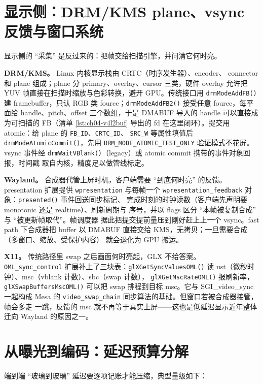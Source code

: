 \documentclass[12pt,a4paper,fontset=fandol]{ctexbook}
\newcommand{\Fn}[1]{\texttt{#1()}}
\newcommand{\Tp}[1]{\texttt{#1}}
\begin{document}
\section{显示侧：DRM/KMS plane、vsync 反馈与窗口系统}

显示侧的 ``采集'' 是反过来的：把帧交给扫描引擎，并问清它何时亮。

\textbf{DRM/KMS。} Linux 内核显示栈由 CRTC（时序发生器）、encoder、
connector 和 plane 组成；plane 分 primary、overlay、cursor 三类，硬件
overlay 允许把 YUV 帧直接在扫描时缩放与色彩转换，避开 GPU。传统接口用
\Fn{drmModeAddFB} 建 framebuffer，只认 RGB 类 fourcc；\Fn{drmModeAddFB2}
接受任意 fourcc，每平面给 handle、pitch、offset 三个数组，于是 DMABUF
导入的 handle 可以直接成为可扫描的 FB（清单 \ref{lst:ch04-v4l2buf} 导出的
fd 在这里闭环）。提交用 atomic：给 plane 的 \Tp{FB\_ID}、\Tp{CRTC\_ID}、
\Tp{SRC\_W} 等属性填值后 \Fn{drmModeAtomicCommit}，先用
\Tp{DRM\_MODE\_ATOMIC\_TEST\_ONLY} 验证模式不花屏。vsync 事件经
\Fn{drmWaitVBlank}（legacy）或 atomic commit 携带的事件对象回报，时间戳
取自内核，精度足以做管线标定。

\textbf{Wayland。} 合成器代管上屏时机，客户端需要 ``到底何时亮'' 的反馈。
presentation 扩展提供 \Tp{wpresentation} 与每帧一个
\Tp{wpresentation\_feedback} 对象：\Fn{presented} 事件回送同步标记、
完成时刻的时钟读数（客户端先声明要 monotonic 还是 realtime）、刷新周期与
序号，并以 flags 区分 ``本帧被复制合成'' 与 ``被更新帧取代''。帧调度器
据此把提交提前量压到刚好赶上上一个 vsync。fast path 下合成器把 buffer
以 DMABUF 直接交给 KMS，无拷贝；一旦需要合成（多窗口、缩放、受保护内容）
就会退化为 GPU 搬运。

\textbf{X11。} 传统路径里 swap 之后画面何时亮起，GLX 不给答案。
\Tp{OML\_sync\_control} 扩展补上了三块表：\Fn{glXGetSyncValuesOML} 读
ust（微秒时钟）、msc（vblank 计数）、sbc（swap 计数），
\Fn{glXGetMscRateOML} 报刷新率，\Fn{glXSwapBuffersMscOML} 可以把 swap
排程到目标 msc。它与 SGI\_video\_sync 一起构成 Mesa 的
\Tp{video\_swap\_chain} 同步算法的基础。但窗口若被合成器接管，帧会多走
一跳，反馈的 msc 就不再等于真实上屏——这也是低延迟显示近年整体迁向
Wayland 的原因之一。

\section{从曝光到编码：延迟预算分解}

端到端 ``玻璃到玻璃'' 延迟要逐项记账才能压缩，典型量级如下：
\end{document}
